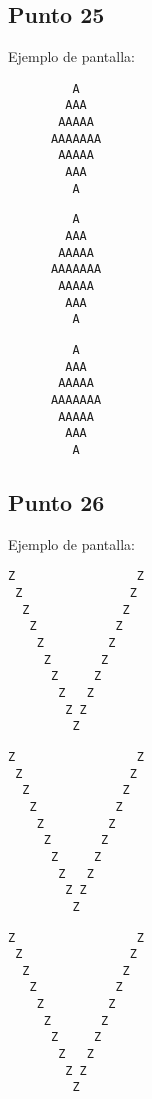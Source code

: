 


\subsection{Punto 25}
	
	Ejemplo de pantalla:
\begin{lstlisting}
         A
        AAA
       AAAAA
      AAAAAAA
       AAAAA
        AAA
         A
\end{lstlisting}

\begin{lstlisting}
         A
        AAA
       AAAAA
      AAAAAAA
       AAAAA
        AAA
         A
\end{lstlisting}

\begin{lstlisting}
         A
        AAA
       AAAAA
      AAAAAAA
       AAAAA
        AAA
         A
\end{lstlisting}




\subsection{Punto 26}
	
	Ejemplo de pantalla:
\begin{lstlisting}
Z                 Z
 Z               Z
  Z             Z
   Z           Z
    Z         Z
     Z       Z
      Z     Z
       Z   Z
        Z Z
         Z
\end{lstlisting}

\begin{lstlisting}
Z                 Z
 Z               Z
  Z             Z
   Z           Z
    Z         Z
     Z       Z
      Z     Z
       Z   Z
        Z Z
         Z
\end{lstlisting}

\begin{lstlisting}
Z                 Z
 Z               Z
  Z             Z
   Z           Z
    Z         Z
     Z       Z
      Z     Z
       Z   Z
        Z Z
         Z
\end{lstlisting}

